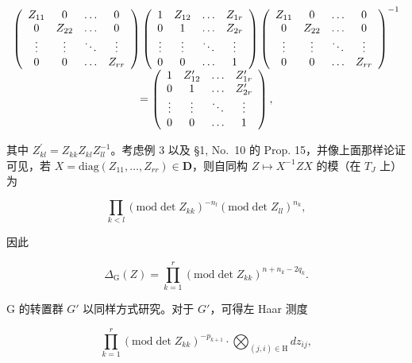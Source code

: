 \[
\begin{array}{c} \left( \begin{array}{c c c c} Z _ {1 1} & 0 & \ldots & 0 \\ 0 & Z _ {2 2} & \ldots & 0 \\ \vdots & \vdots & \ddots & \vdots \\ 0 & 0 & \ldots & Z _ {r r} \end{array} \right) \left( \begin{array}{c c c c} 1 & Z _ {1 2} & \ldots & Z _ {1 r} \\ 0 & 1 & \ldots & Z _ {2 r} \\ \vdots & \vdots & \ddots & \vdots \\ 0 & 0 & \ldots & 1 \end{array} \right) \left( \begin{array}{c c c c} Z _ {1 1} & 0 & \ldots & 0 \\ 0 & Z _ {2 2} & \ldots & 0 \\ \vdots & \vdots & \ddots & \vdots \\ 0 & 0 & \ldots & Z _ {r r} \end{array} \right) ^ {- 1} \\ = \left( \begin{array}{c c c c} 1 & Z _ {1 2} ^ {\prime} & \ldots & Z _ {1 r} ^ {\prime} \\ 0 & 1 & \ldots & Z _ {2 r} ^ {\prime} \\ \vdots & \vdots & \ddots & \vdots \\ 0 & 0 & \ldots & 1 \end{array} \right), \end{array}
\]

其中 \(Z_{kl}^{\prime}=Z_{kk}Z_{kl}Z_{ll}^{-1}\)。考虑例 3 以及 §1, No.~10 的 Prop. 15，并像上面那样论证可见，若 \(X=\mathrm{diag}(Z_{11},\ldots,Z_{rr})\in\mathbf{D}\)，则自同构 \(Z\mapsto X^{-1}ZX\) 的模（在 \(T_{J}\) 上）为

\[
\prod_ {k <   l} (\mathrm{mod} \det Z _ {k k}) ^ {- n _ {l}} (\mathrm{mod} \det Z _ {l l}) ^ {n _ {k}},
\]

因此

\[
\Delta_ {\mathrm{G}} (Z) = \prod_ {k = 1} ^ {r} (\mathrm{mod} \det Z _ {k k}) ^ {n + n _ {k} - 2 q _ {k}}.\tag{10}
\]

G 的转置群 \(G'\) 以同样方式研究。对于 \(G'\)，可得左 Haar 测度

\[
\prod_ {k = 1} ^ {r} (\mathrm{mod} \det Z _ {k k}) ^ {- p _ {k + 1}} \cdot \bigotimes_ {(j, i) \in \mathrm{H}} d z _ {i j},
\]

